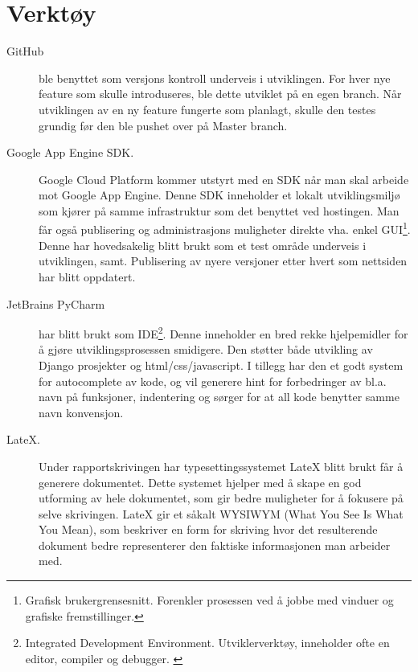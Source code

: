 \section{Verktøy}
\begin{description}
\item[GitHub]ble benyttet som versjons kontroll underveis i utviklingen. For hver nye feature som skulle introduseres, ble dette utviklet på en egen branch. Når utviklingen av en ny feature fungerte som planlagt, skulle den testes grundig før den ble pushet over på Master branch.
\item[Google App Engine SDK.] Google Cloud Platform kommer utstyrt med en SDK når man skal arbeide mot Google App Engine. Denne SDK inneholder et lokalt utviklingsmiljø som kjører på samme infrastruktur som det benyttet ved hostingen. Man får også publisering og administrasjons muligheter direkte vha. enkel GUI\footnote{Grafisk brukergrensesnitt. Forenkler prosessen ved å jobbe med vinduer og grafiske fremstillinger.}. Denne har hovedsakelig blitt brukt som et test område underveis i utviklingen, samt. Publisering av nyere versjoner etter hvert som nettsiden har blitt oppdatert.
\item[JetBrains PyCharm] har blitt brukt som IDE\footnote{Integrated Development Environment. Utviklerverktøy, inneholder ofte en editor, compiler og debugger. \cite{ide:what}}. Denne inneholder en bred rekke hjelpemidler for å gjøre utviklingsprosessen smidigere. Den støtter både utvikling av Django prosjekter og html/css/javascript. I tillegg har den et godt system for autocomplete av kode, og vil generere hint for forbedringer av bl.a. navn på funksjoner, indentering og sørger for at all kode benytter samme navn konvensjon.
\item[LateX.]Under rapportskrivingen har typesettingssystemet LateX blitt brukt får å generere dokumentet. Dette systemet hjelper med å skape en god utforming av hele dokumentet, som gir bedre muligheter for å fokusere på selve skrivingen. LateX gir et såkalt WYSIWYM (What You See Is What You Mean), som beskriver en form for skriving hvor det resulterende dokument bedre representerer den faktiske informasjonen man arbeider med.



\end{description}

